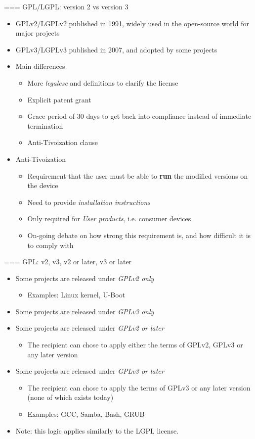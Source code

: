 === {GPL/LGPL: version 2 vs version 3}
  \begin{itemize}
  \item GPLv2/LGPLv2 published in 1991, widely used in the open-source
    world for major projects
  \item GPLv3/LGPLv3 published in 2007, and adopted by some projects
  \item Main differences
    \begin{itemize}
    \item More {\em legalese} and definitions to clarify the license
    \item Explicit patent grant
    \item Grace period of 30 days to get back into compliance instead
      of immediate termination
    \item Anti-Tivoization clause
    \end{itemize}
  \item Anti-Tivoization
    \begin{itemize}
    \item Requirement that the user must be able to {\bf run} the
      modified versions on the device
    \item Need to provide {\em installation instructions}
    \item Only required for {\em User products}, i.e. consumer devices
    \item On-going debate on how strong this requirement is, and how
      difficult it is to comply with
    \end{itemize}
  \end{itemize}


=== {GPL: v2, v3, v2 or later, v3 or later}
  \begin{itemize}
  \item Some projects are released under {\em GPLv2 only}
    \begin{itemize}
    \item Examples: Linux kernel, U-Boot
    \end{itemize}
  \item Some projects are released under {\em GPLv3 only}
  \item Some projects are released under {\em GPLv2 or later}
    \begin{itemize}
    \item The recipient can chose to apply either the terms of GPLv2,
      GPLv3 or any later version
    \end{itemize}
  \item Some projects are released under {\em GPLv3 or later}
    \begin{itemize}
    \item The recipient can chose to apply the terms of GPLv3 or any
      later version (none of which exists today)
    \item Examples: GCC, Samba, Bash, GRUB
    \end{itemize}
  \item Note: this logic applies similarly to the LGPL license.
  \end{itemize}


